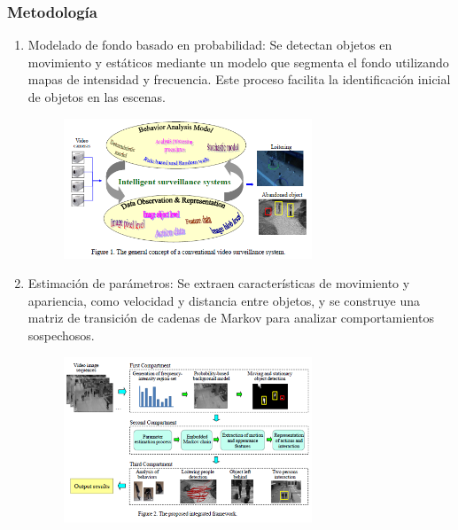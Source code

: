 \documentclass[listof=nochaptergap,12pt,times,authoryear]{report}
\begin{document}
\subsubsection{Metodología}
\begin{enumerate}

    \item Modelado de fondo basado en probabilidad: Se detectan objetos en movimiento y estáticos mediante un modelo que segmenta el fondo utilizando mapas de intensidad y frecuencia. Este proceso facilita la identificación inicial de objetos en las escenas.

    \begin{figure}[h] %
    \centering
    \includegraphics[width=0.7\textwidth]{met8.png} %
    \label{fig:ejemplo} %
    \end{figure}

    \item Estimación de parámetros: Se extraen características de movimiento y apariencia, como velocidad y distancia entre objetos, y se construye una matriz de transición de cadenas de Markov para analizar comportamientos sospechosos.

    \begin{figure}[h] %
    \centering
    \includegraphics[width=0.7\textwidth]{met8.1.png} %
    \label{fig:ejemplo} %
    \end{figure}


\end{enumerate}
\end{document}
